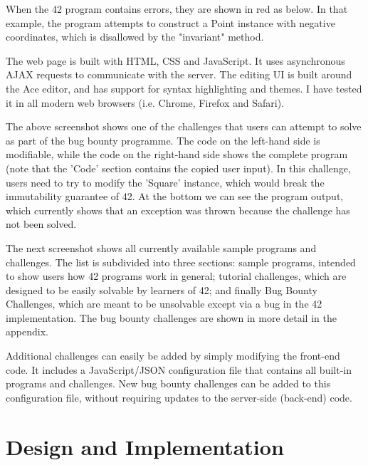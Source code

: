 
When the 42 program contains errors, they are shown in red as below. In that example, the program attempts to construct a Point instance with negative coordinates, which is disallowed by the "invariant" method.


The web page is built with HTML, CSS and JavaScript. It uses asynchronous AJAX requests to communicate with the server. The editing UI is built around the Ace editor, and has support for syntax highlighting and themes. I have tested it in all modern web browsers (i.e. Chrome, Firefox and Safari).


The above screenshot shows one of the challenges that users can attempt to solve as part of the bug bounty programme. The code on the left-hand side is modifiable, while the code on the right-hand side shows the complete program (note that the 'Code' section contains the copied user input). In this challenge, users need to try to modify the 'Square' instance, which would break the immutability guarantee of 42. At the bottom we can see the program output, which currently shows that an exception was thrown because the challenge has not been solved.

The next screenshot shows all currently available sample programs and challenges. The list is subdivided into three sections: sample programs, intended to show users how 42 programs work in general; tutorial challenges, which are designed to be easily solvable by learners of 42; and finally Bug Bounty Challenges, which are meant to be unsolvable except via a bug in the 42 implementation. The bug bounty challenges are shown in more detail in the appendix.


Additional challenges can easily be added by simply modifying the front-end code. It includes a JavaScript/JSON configuration file that contains all built-in programs and challenges. New bug bounty challenges can be added to this configuration file, without requiring updates to the server-side (back-end) code.

\chapter{Design and Implementation}

